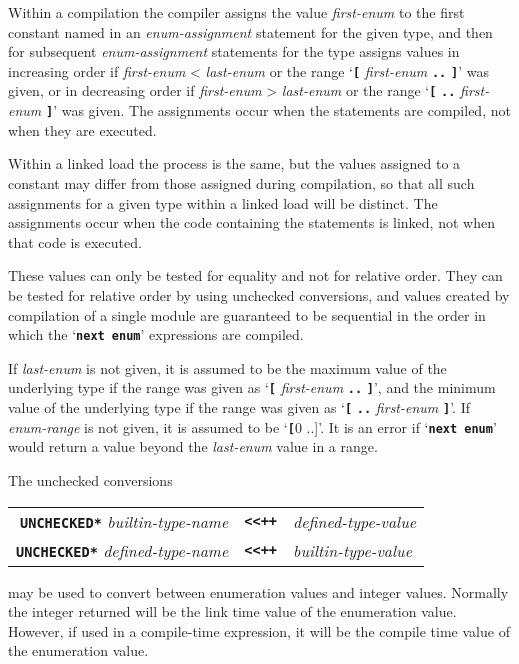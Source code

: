 \documentclass[12pt]{article}
\newcommand{\TT}[1]{{\tt \bfseries #1}}
\begin{document}
Within a compilation the compiler assigns the value {\em first-enum}
to the first constant named in an {\em enum-assignment} statement for
the given type, and then for subsequent
{\em enum-assignment} statements for the type
assigns values in increasing order if {\em first-enum} < {\em last-enum}
or the range `\TT{[} {\em first-enum} \TT{..} \TT{]}' was given,
or in decreasing order if {\em first-enum} > {\em last-enum}
or the range `\TT{[} \TT{..} {\em first-enum} \TT{]}' was given.
The assignments occur when the statements are
compiled, not when they are executed.

Within a linked load the process is the same, but the values assigned
to a constant may differ from those assigned during compilation,
so that all such assignments for a given type within a linked load
will be distinct.  The assignments occur when the code containing
the statements is linked, not when that code is executed.

These values can only be tested for equality and not for
relative order.  They can be tested for relative order by
using unchecked conversions, and values created by compilation
of a single module are guaranteed to be sequential in the order
in which the `\TT{next enum}' expressions are compiled.

If {\em last-enum} is not given, it is assumed to be the maximum
value of the underlying type
if the range was given as `\TT{[} {\em first-enum} \TT{..} \TT{]}',
and the minimum value of the underlying type
if the range was given as `\TT{[} \TT{..} {\em first-enum} \TT{]}'.
If {\em enum-range} is not given,
it is assumed to be `\TT[0 ..]'.  It is an error if `\TT{next~enum}'
would return a value beyond the {\em last-enum} value in a range.

The unchecked conversions
\begin{center}
\begin{tabular}{rcl}
\TT{*UNCHECKED*} {\em builtin-type-name}
	& \TT{<{}<++} & {\em defined-type-value} \\
\TT{*UNCHECKED*} {\em defined-type-name}
	& \TT{<{}<++} & {\em builtin-type-value} \\
\end{tabular}
\end{center}
may be used to convert between enumeration values and integer values.
Normally the integer
returned will be the link time value of the enumeration value.
However, if used in a compile-time expression, it will be the
compile time value of the enumeration value.
\end{document}
